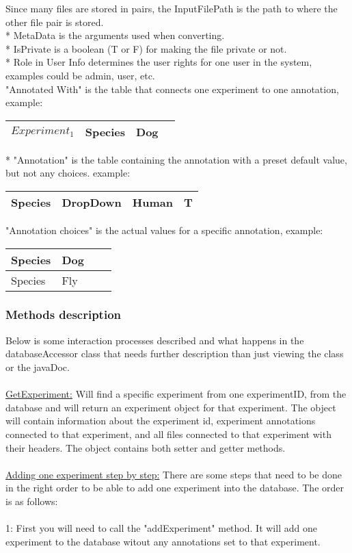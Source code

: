 Since many files are stored in pairs, the InputFilePath is the path to where the other file pair  is stored.\\
* MetaData is the arguments used when converting. \\
* IsPrivate is a boolean (T or F) for making the file private or not.\\
* Role in User Info determines the user rights for one user in the system, examples could be admin, user, etc.\\
"Annotated With" is the table that connects one experiment to one annotation, example:
\begin{center}
  \begin{tabular}{| l | l | l | l|}
    \hline
    $Experiment_1$ & Species & Dog\\ \hline
  \end{tabular}
\end{center}
* "Annotation" is the table containing the annotation with a preset default value, but not any choices. example:
\begin{center}
  \begin{tabular}{| l | l | l | l|}
    \hline
    Species & DropDown & Human & T \\ \hline
  \end{tabular}
\end{center}
"Annotation choices" is the actual values for a specific annotation, example:\\
\begin{center}
  \begin{tabular}{| l | l | l | l|}
    \hline
    Species & Dog \\ \hline
    Species & Fly \\ \hline
  \end{tabular}
\end{center}

\subsubsection{Methods description}
Below is some interaction processes described and what happens in the databaseAccessor class that needs further description than just viewing the class or the javaDoc.\\
\\
\underline{GetExperiment:} Will find a specific experiment from one experimentID, from the database and will return an experiment object for that experiment. The object will contain information about the experiment id, experiment annotations connected to that experiment, and all files connected to that experiment with their headers. The object contains both setter and getter methods. \\
\\
\underline{Adding one experiment step by step:}
There are some steps that need to be done in the right order to be able to add one experiment into the database. The order is as follows:\\
\\
1: First you will need to call the "addExperiment" method. It will add one experiment to the database witout any annotations set to that experiment. 

